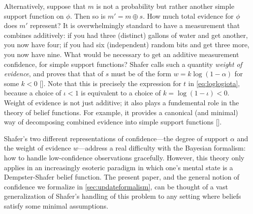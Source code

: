 \begin{example}
Alternatively, suppose that $m$ is not a probability but rather
another simple support function on $\phi$. 
Then so is $m' = m\oplus s$. 
How much total evidence for $\phi$ does $m'$ represent?
It is overwhelmingly standard to have a measurement that combines additively:
if you had three (distinct) gallons of water and get another, you now have four;
if you had six (independent) random bits and get three more, you now have nine. 
What would be necessary to get an additive measurement confidence, 
for simple support functions? 
Shafer calls such a quantity \emph{weight of evidence},
and proves that that of $s$ must be of the form
$w = k \log (1-\alpha)$ for some $k < 0$
[\citeauthor[pg 78]{shafer1976mathematical}]. 
Note that this is precisely the expression for $t$
in \eqref{eq:loglogiota}, 
because a choice of $\iota < 1$
is equivalent to a choice of $k = \log(1-\iota) < 0$.
Weight of evidence is
not just additive;
it also plays a fundemental role in the theory of belief
functions.
For example, it provides a
canonical (and minimal) way of decomposing
combined evidence into simple support functions
[\citeauthor[Theorem 5.5]{shafer1976mathematical}].
\end{example}

Shafer's two different representations of confidence---the
degree of support $\alpha$ and the weight of evidence $w$---address
a real difficulty with the Bayesian formalism: how to handle
low-confidence observations gracefully. 
However, this theory only applies in an increasingly esoteric paradigm in which
one's mental state is a Dempster-Shafer belief function. 
The present paper, and the general notion of confidence we
formalize in \cref{sec:updateformalism}, can be thought of a vast
generalization of Shafer's handling of this problem to any setting
where beliefs satisfy some minimal assumptions.

